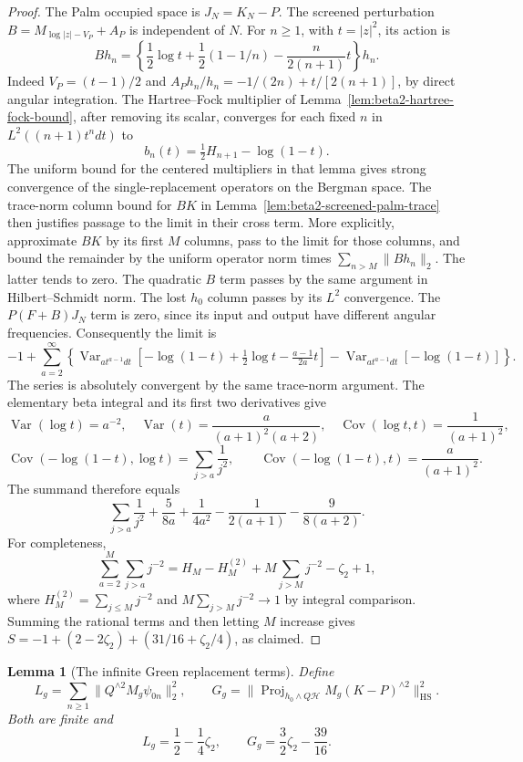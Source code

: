\documentclass[11pt,a4paper]{article}
\numberwithin{equation}{section}
\newtheorem{lemma}[theorem]{Lemma}
\theoremstyle{definition}
\theoremstyle{remark}
\begin{document}
\begin{proof}
The Palm occupied space is $J_N=K_N-P$.  The screened perturbation
$B=M_{\log|z|-V_P}+A_P$ is independent of $N$.  For $n\ge1$, with
$t=|z|^2$, its action is
\[
 Bh_n=\left\{\frac12\log t+\frac12(1-1/n)
                    -\frac{n}{2(n+1)}t\right\}h_n.
\]
Indeed $V_P=(t-1)/2$ and
$A_Ph_n/h_n=-1/(2n)+t/[2(n+1)]$, by direct angular integration.
The Hartree--Fock multiplier of Lemma~\ref{lem:beta2-hartree-fock-bound},
after removing its scalar, converges for each fixed $n$ in
$L^2((n+1)t^n dt)$ to
\[
 b_n(t)=\tfrac12H_{n+1}-\log(1-t).
\]
The uniform bound for the centered multipliers in that lemma gives
strong convergence of the single-replacement operators on the
Bergman space.  The trace-norm column bound for $BK$ in
Lemma~\ref{lem:beta2-screened-palm-trace} then justifies passage to
the limit in their cross term.  More explicitly, approximate $BK$
by its first $M$ columns, pass to the limit for those columns, and
bound the remainder by the uniform operator norm times
$\sum_{n>M}\|Bh_n\|_2$.  The latter tends to zero.  The quadratic
$B$ term passes by the same argument in Hilbert--Schmidt norm.
The lost $h_0$ column passes by its $L^2$ convergence.  The
$P(F+B)J_N$ term is zero, since its input and output have different
angular frequencies.  Consequently the limit is
\[
 -1+\sum_{a=2}^{\infty}
 \left\{\operatorname{Var}_{a t^{a-1}dt}
  \left[-\log(1-t)+\tfrac12\log t-\tfrac{a-1}{2a}t\right]
       -\operatorname{Var}_{a t^{a-1}dt}[-\log(1-t)]\right\}.
\]
The series is absolutely convergent by the same trace-norm argument.
The elementary beta integral and its first two derivatives give
\[
 \operatorname{Var}(\log t)=a^{-2},\quad
 \operatorname{Var}(t)=\frac{a}{(a+1)^2(a+2)},\quad
 \operatorname{Cov}(\log t,t)=\frac1{(a+1)^2},
\]
\[
 \operatorname{Cov}(-\log(1-t),\log t)=\sum_{j>a}\frac1{j^2},
 \qquad
 \operatorname{Cov}(-\log(1-t),t)=\frac{a}{(a+1)^2}.
\]
The summand therefore equals
\[
 \sum_{j>a}\frac1{j^2}
 +\frac5{8a}+\frac1{4a^2}-\frac1{2(a+1)}-\frac9{8(a+2)}.
\]
For completeness,
\[
 \sum_{a=2}^M\sum_{j>a}j^{-2}
 =H_M-H_M^{(2)}+M\sum_{j>M}j^{-2}-\zeta_2+1,
\]
where $H_M^{(2)}=\sum_{j\le M}j^{-2}$ and
$M\sum_{j>M}j^{-2}\to1$ by integral comparison.
Summing the rational terms and then letting $M$ increase gives
$S=-1+(2-2\zeta_2)+(31/16+\zeta_2/4)$, as claimed.
\end{proof}

\begin{lemma}[The infinite Green replacement terms]
\label{lem:beta2-exact-center-green}
Define
\[
 L_g=\sum_{n\ge1}\|Q^{\wedge2}M_g\psi_{0n}\|_2^2,
 \qquad
 G_g=\|\operatorname{Proj}_{h_0\wedge Q\mathcal H}
                 M_g(K-P)^{\wedge2}\|_{\mathrm{HS}}^2.
\]
Both are finite and
\[
 L_g=\frac12-\frac14\zeta_2,\qquad
 G_g=\frac32\zeta_2-\frac{39}{16}.
\]
\end{lemma}
\end{document}
